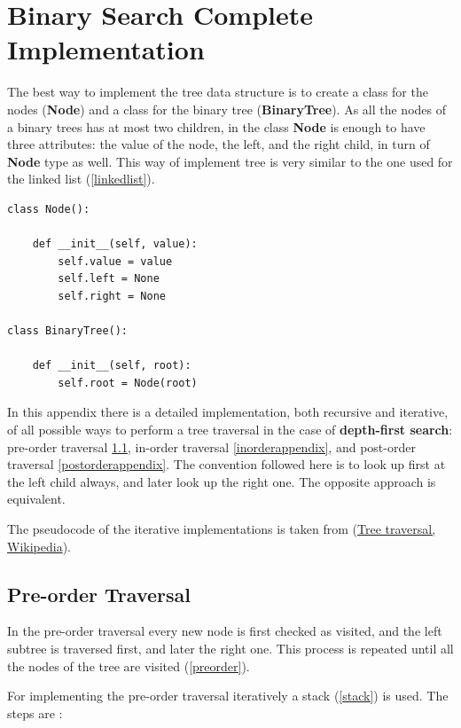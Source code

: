 \chapter{Binary Search Complete Implementation}
\label{binappendix}
The best way to implement the tree data structure is to create a class for the nodes (\textbf{Node}) and a class for the binary tree (\textbf{BinaryTree}). As all the nodes of a binary trees has at most two children, in the class \textbf{Node} is enough to have three attributes: the value of the node, the left, and the right child, in turn of \textbf{Node} type as well. This way of implement tree is very similar to the one used for the \hyperref[linked list]{} linked list (\ref{linkedlist}).

\begin{lstlisting}[firstnumber=1, caption={Class definition for a node and a tree.}]
class Node():

	def __init__(self, value):
		self.value = value
		self.left = None
		self.right = None

class BinaryTree():

	def __init__(self, root):
		self.root = Node(root)
\end{lstlisting}

In this appendix there is a detailed implementation, both recursive and iterative, of all possible ways to perform a tree traversal in the case of \textbf{depth-first search}: pre-order traversal \ref{preorderappendix}, in-order traversal \ref{inorderappendix}, and post-order traversal \ref{postorderappendix}. The convention followed here is to look up first at the left child always, and later look up the right one. The opposite approach is equivalent.

The pseudocode of the iterative implementations is taken from \cite{wikitreestrav}(\href{https://en.wikipedia.org/wiki/Tree_traversal}{Tree traversal, Wikipedia}).

\section{Pre-order Traversal}
\label{preorderappendix}
In the pre-order traversal every new node is first checked as visited, and the left subtree is traversed first, and later the right one. This process is repeated until all the nodes of the tree are visited (\ref{preorder}). 

For implementing the pre-order traversal iteratively a stack (\ref{stack}) is used. The steps are \cite{wikitreestrav}:

